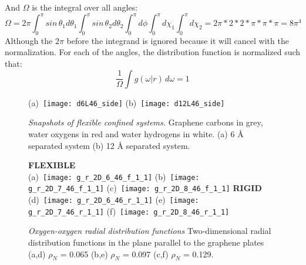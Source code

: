 \documentclass[12pt]{article}
\begin{document}
And \(\Omega\) is the integral over all angles:
\begin{equation}
    \Omega = 2\pi \int_0^\pi sin \, \theta_1 d \theta_1 \int_0^\pi sin \, \theta_2 d \theta_2 \int_0^\pi d\phi\int_0^\pi d\chi_1 \int_0^\pi d\chi_2 = 2 \pi * 2 * 2 * \pi * \pi * \pi = 8 \pi^4
\end{equation}
Although the \(2\pi\) before the integrand is ignored because it will cancel with the normalization. For each of the angles, the distribution function is normalized such that:
\begin{equation}
    \frac{1}{\Omega} \int g(\omega | r ) \, d \omega = 1  
\end{equation}

\begin{figure}[h!]
	\centering
	(a)~\texttt{[image: d6L46\_side]} 
	(b)~\texttt{[image: d12L46\_side]}
	\vspace{-10pt}
	\caption{\textit{Snapshots of flexible confined systems.} Graphene carbons in grey, water oxygens in red and water hydrogens in white. (a) 6 \r A separated system (b) 12 \r A separated system. }
	\label{fig:chem_forms}
\end{figure}

\begin{figure}[h!]
	\centering
	\textbf{FLEXIBLE} \\
	(a)~\texttt{[image: g\_r\_2D\_6\_46\_f\_1\_1]} 
	(b)~\texttt{[image: g\_r\_2D\_7\_46\_f\_1\_1]}
	(c)~\texttt{[image: g\_r\_2D\_8\_46\_f\_1\_1]}
	\textbf{RIGID} \\
	(d)~\texttt{[image: g\_r\_2D\_6\_46\_r\_1\_1]} 
	(e)~\texttt{[image: g\_r\_2D\_7\_46\_r\_1\_1]}
	(f)~\texttt{[image: g\_r\_2D\_8\_46\_r\_1\_1]}
	\vspace{-10pt}
	\caption{\textit{Oxygen-oxygen radial distribution functions} Two-dimensional radial distribution functions in the plane parallel to the graphene plates (a,d) \(\rho_N\) = 0.065 (b,e) \(\rho_N\) = 0.097 (c,f) \(\rho_N\) = 0.129.}
	\label{fig:chem_forms}
\end{figure}
\end{document}
